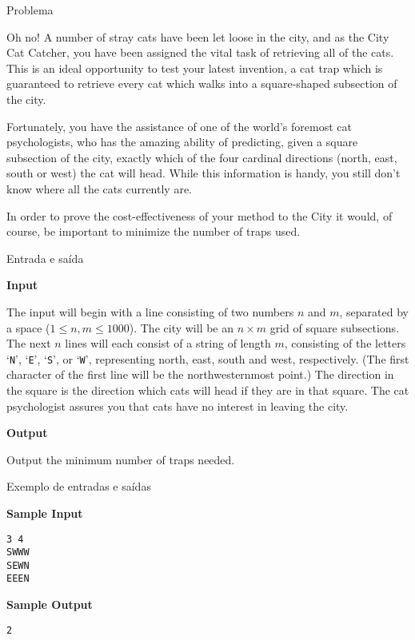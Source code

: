 
\begin{frame}[fragile]{Problema}

Oh no! A number of stray cats have been let loose in the city, and as the City Cat Catcher, you have been assigned the vital task of retrieving all of the cats. This is an ideal opportunity to test your latest invention, a cat trap which is guaranteed to retrieve every cat which walks into a square-shaped subsection of the city.

Fortunately, you have the assistance of one of the world's foremost cat psychologists, who has the amazing ability of predicting, given a square subsection of the city, exactly which of the four cardinal directions (north, east, south or west) the cat will head. While this information is handy, you still don't know where all the cats currently are.

In order to prove the cost-effectiveness of your method to the City it would, of course, be important to minimize the number of traps used.

\end{frame}

\begin{frame}[fragile]{Entrada e saída}

\textbf{Input}

The input will begin with a line consisting of two numbers $n$ and $m$, separated by a space 
($1 \leq n, m \leq 1000$). The city will be an $n \times m$ grid of square subsections. The next 
$n$ lines will each consist of a string of length $m$, consisting of the letters `\texttt{N}', 
`\texttt{E}', `\texttt{S}', or `\texttt{W}', representing north, east, south and west, 
respectively. (The first character of the first line will be the northwesternmost point.) The 
direction in the square is the direction which cats will head if they are in that square. The cat 
psychologist assures you that cats have no interest in leaving the city.

\textbf{Output}

Output the minimum number of traps needed.

\end{frame}

\begin{frame}[fragile]{Exemplo de entradas e saídas}

\begin{minipage}[t]{0.5\textwidth}
\textbf{Sample Input}
\begin{verbatim}
3 4
SWWW
SEWN
EEEN
\end{verbatim}
\end{minipage}
\begin{minipage}[t]{0.45\textwidth}
\textbf{Sample Output}
\begin{verbatim}
2
\end{verbatim}
\end{minipage}
\end{frame}

